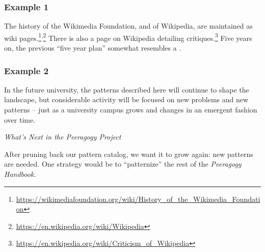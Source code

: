 \subsubsection*{Example 1} The history of the Wikimedia Foundation,
and of Wiki\-pedia, are maintained as wiki
pages.\footnote{\url{https://wikimediafoundation.org/wiki/History_of_the_Wikimedia_Foundation}}\textsuperscript{,}\footnote{\url{https://en.wikipedia.org/wiki/Wikipedia}}
There is also a page on Wikipedia detailing
critiques.\footnote{\url{https://en.wikipedia.org/wiki/Criticism_of_Wikipedia}}
Five years on, the previous ``five year plan'' somewhat resembles a  \cite{wikimedia2011plan}.  

\subsubsection*{Example 2} 
In the future university, the patterns described here will continue to
shape the landscape, but considerable activity will be focused on new
problems and new patterns -- just as a university campus grows and
changes in an emergent fashion over time.


\begin{framed}
\noindent 
\emph{What's Next in the Peeragogy Project}
\begin{collectinmacro}{\ScrapbookWN}{}{}
After pruning back our pattern catalog, we want it to grow again: new patterns are needed.
One strategy would be to ``patternize'' the rest of the \emph{Peeragogy Handbook.}
\end{collectinmacro}
\ScrapbookWN
\end{framed}


\newpage
